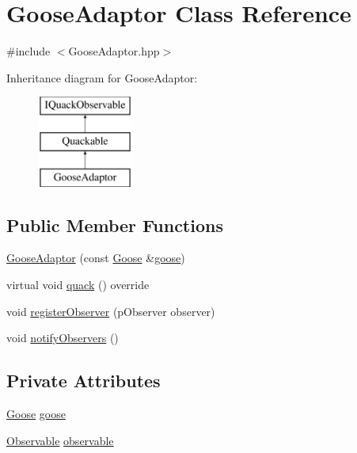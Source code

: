 \hypertarget{classGooseAdaptor}{\section{Goose\-Adaptor Class Reference}
\label{classGooseAdaptor}
}


{\ttfamily \#include $<$Goose\-Adaptor.\-hpp$>$}

Inheritance diagram for Goose\-Adaptor\-:\begin{figure}[H]
\begin{center}
\leavevmode
\includegraphics[height=3.000000cm]{classGooseAdaptor}
\end{center}
\end{figure}
\subsection*{Public Member Functions}
\begin{DoxyCompactItemize}
\item 
\hyperlink{classGooseAdaptor_ae21f2cdc0fb40342822871a8707b31c0}{Goose\-Adaptor} (const \hyperlink{classGoose}{Goose} \&\hyperlink{classGooseAdaptor_a723584e4a4277e8c3802ca9fa69fa30d}{goose})
\item 
virtual void \hyperlink{classGooseAdaptor_ae7b77a04d41102f386baf4f7ce7943f2}{quack} () override
\item 
void \hyperlink{classGooseAdaptor_ab439fc56798543fb6ee48f52d20a5ddb}{register\-Observer} (p\-Observer observer)
\item 
void \hyperlink{classGooseAdaptor_aedde36f5569b473495e840ae6da28a89}{notify\-Observers} ()
\end{DoxyCompactItemize}
\subsection*{Private Attributes}
\begin{DoxyCompactItemize}
\item 
\hyperlink{classGoose}{Goose} \hyperlink{classGooseAdaptor_a723584e4a4277e8c3802ca9fa69fa30d}{goose}
\item 
\hyperlink{classObservable}{Observable} \hyperlink{classGooseAdaptor_abbfd47943a0323e667083b7a1c4de51c}{observable}
\end{DoxyCompactItemize}


